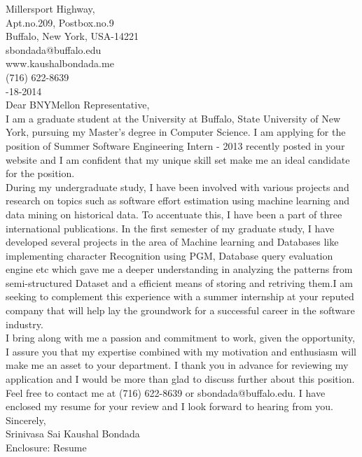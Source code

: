 \documentclass[10pt,letterpaper,oneside]{article}
\begin{document}
 Millersport Highway,\\
Apt.no.209, Postbox.no.9\\
Buffalo, New York, USA-14221\\
sbondada@buffalo.edu\\
www.kaushalbondada.me\\
(716) 622-8639\\

-18-2014\\
 
\noindent Dear BNYMellon Representative,\\
 
I am a graduate student at the University at Buffalo, State University of New York, pursuing my Master's degree in Computer Science. I am applying
for the position of Summer Software Engineering Intern - 2013 recently posted  in your website and I am confident that my unique skill set
make me an ideal candidate for the position.\\

During my undergraduate study, I have been involved with various projects and research on  topics such as software effort estimation using
machine learning and data mining on historical data. To accentuate this, I have been a part of three international publications. In the first
semester of my graduate study, I have developed several  projects in the area of Machine learning and Databases like implementing character
Recognition using PGM, Database query evaluation engine etc which gave me a deeper understanding in analyzing the patterns from
semi-structured Dataset and a efficient means of storing and retriving them.I am seeking to complement this experience with a summer
internship at your reputed company that will help lay the groundwork for a successful career in the software industry.\\
 
I bring along with me a passion and commitment to work, given the opportunity, I assure you that my expertise combined with my motivation
and enthusiasm will make me an asset to your department. I thank you in advance for reviewing my application and I would be more than glad to
discuss further about this position. Feel free to contact me at (716) 622-8639 or sbondada@buffalo.edu. I have enclosed my resume for your review and I look forward to hearing from you.\\
 
\noindent Sincerely,\\
Srinivasa Sai Kaushal Bondada\\
Enclosure: Resume\\
\end{document}
